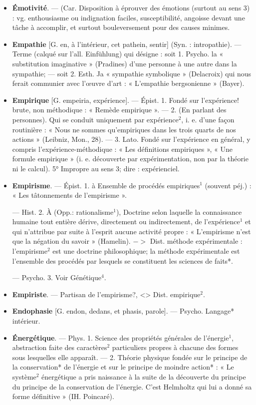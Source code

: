 \begin{itemize}[leftmargin=1cm, label=, itemsep=1pt]
\item {\bf Émotivité}. — (Car. Disposition à
éprouver des émotions (surtout au
sens 3) : vg. enthousiasme ou indignation faciles, susceptibilité, angoisse devant une tâche à accomplir,
et surtout bouleversement pour des
causes minimes.

\item {\bf Empathie} [G. en, à l'intérieur, cet
pathein, sentir] (Syn. : intropathie).
— Terme (calqué sur l’all. Einfühlung) qui désigne : soit 1. Psycho. la
« substitution imaginative » (Pradines) d’une personne à une autre
dans la sympathie; — soit 2. Esth.
Ja « sympathie symbolique » (Delacroix) qui nous ferait communier
avec l’œuvre d'art : « L’empathie
bergsonienne » (Bayer).

\item {\bf Empirique} [G. empeiria, expérience].
— Épist. 1. Fondé sur l'expérience!
brute, non méthodique : « Remède
empirique ». — 2. (En parlant des
personnes). Qui se conduit uniquement par expérience$^2$, i. e. d'une
façon routinière : « Nous ne sommes
qu’empiriques dans les trois quarts
de nos actions » (Leibniz, Mon., 28).
— 3. Lato. Fondé sur l'expérience
en général, y compris l’expérience-méthodique : « Les définitions empiriques », « Une formule empirique » (i. e. découverte par expérimentation, non par la théorie ni le
calcul). 5° Impropre au sens 3;
dire : expérienciel.

\item {\bf Empirisme}. — Épist. 1. à Ensemble de
procédés empiriques$^1$ (souvent péj.) :
« Les tâtonnements de l’empirisme ».

— Hist. 2. À (Opp.: rationalisme$^1$),
Doctrine selon laquelle la connaissance humaine tout entière dérive,
directement ou indirectement, de
l'expérience$^1$ et qui n’attribue par
suite à l'esprit aucune activité propre : « L’empirisme n’est que la
négation du savoir » (Hamelin).
$->$ Dist. méthode expérimentale :
l'empirisme$^2$ est une doctrine philosophique; la méthode expérimentale
est l'ensemble des procédés par
lesquels se constituent les sciences
de faits*.

— Psycho. 3. Voir Génétique$^4$.

\item {\bf Empiriste}. — Partisan de l'empirisme?, <> Dist. empirique$^2$.

\item {\bf Endophasie} [G. endon, dedans, et
phasis, parole]. — Psycho. Langage*
intérieur.

\item {\bf Énergétique}. — Phys. 1. Science des
propriétés générales de l’énergie$^1$,
abstraction faite des caractères$^2$
particuliers propres à chacune des
formes sous lesquelles elle apparaît.
— 2. Théorie physique fondée sur
le principe de la conservation* de
l'énergie et sur le principe de moindre
action* : « Le système$^2$ énergétique
a pris naissance à la suite de la
découverte du principe du principe
de la conservation de l'énergie. C’est
Helmholtz qui lui a donné sa forme
définitive » (IH. Poincaré).


\end{itemize}
